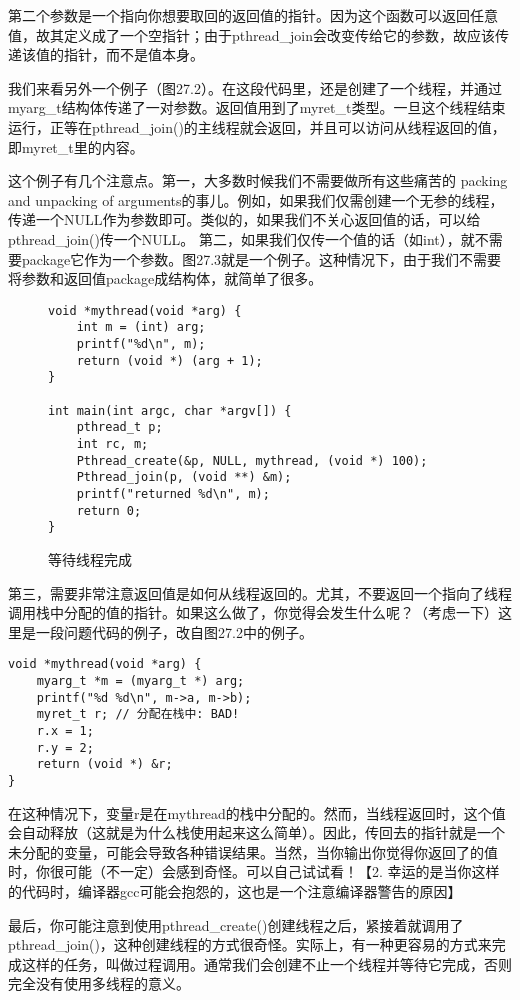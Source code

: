 第二个参数是一个指向你想要取回的返回值的指针。因为这个函数可以返回任意值，故其定义成了一个空指针；由于pthread\_join会改变传给它的参数，故应该传递该值的指针，而不是值本身。

我们来看另外一个例子（图27.2）。在这段代码里，还是创建了一个线程，并通过myarg\_t结构体传递了一对参数。返回值用到了myret\_t类型。一旦这个线程结束运行，正等在pthread\_join()的主线程就会返回，并且可以访问从线程返回的值，即myret\_t里的内容。



这个例子有几个注意点。第一，大多数时候我们不需要做所有这些痛苦的 packing and unpacking of arguments的事儿。例如，如果我们仅需创建一个无参的线程，传递一个NULL作为参数即可。类似的，如果我们不关心返回值的话，可以给pthread\_join()传一个NULL。
第二，如果我们仅传一个值的话（如int），就不需要package它作为一个参数。图27.3就是一个例子。这种情况下，由于我们不需要将参数和返回值package成结构体，就简单了很多。

\begin{figure}[h]
\begin{lstlisting}
void *mythread(void *arg) {
	int m = (int) arg;
	printf("%d\n", m);
	return (void *) (arg + 1);
}

int main(int argc, char *argv[]) {
	pthread_t p;
	int rc, m;
	Pthread_create(&p, NULL, mythread, (void *) 100);
	Pthread_join(p, (void **) &m);
	printf("returned %d\n", m);
	return 0;
}
\end{lstlisting}
\caption{等待线程完成}
\end{figure}

第三，需要非常注意返回值是如何从线程返回的。尤其，不要返回一个指向了线程调用栈中分配的值的指针。如果这么做了，你觉得会发生什么呢？（考虑一下）这里是一段问题代码的例子，改自图27.2中的例子。

\begin{verbatim}
void *mythread(void *arg) {
    myarg_t *m = (myarg_t *) arg;
    printf("%d %d\n", m->a, m->b);
    myret_t r; // 分配在栈中: BAD!
    r.x = 1;
    r.y = 2;
    return (void *) &r;
}
\end{verbatim}

在这种情况下，变量r是在mythread的栈中分配的。然而，当线程返回时，这个值会自动释放（这就是为什么栈使用起来这么简单）。因此，传回去的指针就是一个未分配的变量，可能会导致各种错误结果。当然，当你输出你觉得你返回了的值时，你很可能（不一定）会感到奇怪。可以自己试试看！【2. 幸运的是当你这样的代码时，编译器gcc可能会抱怨的，这也是一个注意编译器警告的原因】

最后，你可能注意到使用pthread\_create()创建线程之后，紧接着就调用了pthread\_join()，这种创建线程的方式很奇怪。实际上，有一种更容易的方式来完成这样的任务，叫做过程调用。通常我们会创建不止一个线程并等待它完成，否则完全没有使用多线程的意义。

